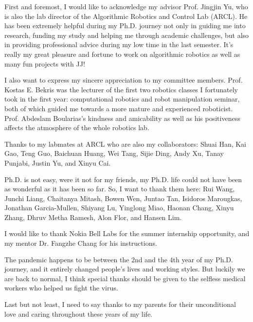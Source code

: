 
\begin{acknowledgments}
First and foremost, I would like to acknowledge my advisor Prof. Jingjin Yu, 
who is also the lab director of the Algorithmic Robotics and Control Lab (ARCL). 
He has been extremely helpful during my Ph.D. journey 
not only in guiding me into research, funding my study and helping me through academic challenges, 
but also in providing professional advice during my low time in the last semester. 
It's really my great pleasure and fortune to work on algorithmic robotics 
as well as many fun projects with JJ! 

I also want to express my sincere appreciation to my committee members. 
Prof. Kostas E. Bekris was the lecturer of the first two robotics classes I fortunately took in the first year: 
computational robotics and robot manipulation seminar, both of which guided me 
towards a more mature and experienced roboticist. 
Prof. Abdeslam Boularias's kindness and amicability as well as his positiveness affects
the atmosphere of the whole robotics lab.

Thanks to my labmates at ARCL who are also my collaborators: Shuai Han, 
Kai Gao, Teng Guo, Baichuan Huang, Wei Tang, Sijie Ding, Andy Xu, Tanay Punjabi, 
Justin Yu, and Xinyu Cai. 

Ph.D. is not easy, were it not for my friends, my Ph.D. life 
could not have been as wonderful as it has been so far. 
So, I want to thank them here: Rui Wang, Junchi Liang, Chaitanya Mitash, Bowen Wen, Juntao Tan, 
Isidoros Marougkas, Jonathan Garcia-Mullen, Shiyang Lu, Yinglong Miao, Haonan Chang, Xinyu Zhang, 
Dhruv Metha Ramesh, Alon Flor, and Hansen Lim. 

I would like to thank Nokia Bell Labs for the summer internship opportunity,
and my mentor Dr. Fangzhe Chang for his instructions.

The pandemic happens to be between the 2nd and the 4th year of my Ph.D. journey, 
and it entirely changed people's lives and working styles. 
But luckily we are back to normal, I think special thanks should be given to the 
selfless medical workers who helped us fight the virus. 

Last but not least, I need to say thanks to my parents for their unconditional love 
and caring throughout these years of my life. 

\end{acknowledgments}
